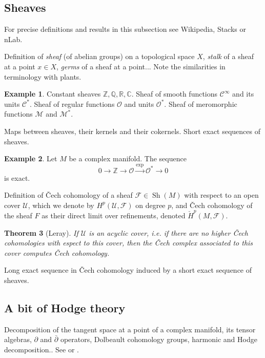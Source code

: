 \documentclass[11pt,A4]{article}
\theoremstyle{plain}
\newtheorem{thm}{Theorem}[section]
\theoremstyle{definition}
\newtheorem{exa}[thm]{Example}
\theoremstyle{remark}
\newcommand{\Z}{\mathbb{Z}}
\newcommand{\Q}{\mathbb{Q}}
\newcommand{\R}{\mathbb{R}}
\newcommand{\1}{\mathbbm{1}}
\newcommand{\C}{\mathbb{C}}
\newcommand{\calC}{\mathcal{C}}
\newcommand{\F}{\mathcal{F}}
\newcommand{\M}{\mathcal{M}}
\renewcommand{\O}{\mathcal{O}}
\newcommand{\U}{\mathcal{U}}
\DeclareMathOperator{\Sh}{Sh}
\begin{document}
\subsection{Sheaves}

For precise definitions and results in this subsection see Wikipedia, Stacks or nLab.

Definition of \textit{sheaf} (of abelian groups) on a topological space $X$, \textit{stalk} of a sheaf at a point $x\in X$, \textit{germs} of a sheaf at a point... Note the similarities in terminology with plants.

\begin{exa}
    Constant sheaves $\Z,\Q,\R,\C$.
    Sheaf of smooth functions $\calC^{\infty}$ and its units $\calC^{*}$.
    Sheaf of regular functions $\O$ and units $\O^{*}$.
    Sheaf of meromorphic functions $\M$ and $\M^{*}$.
\end{exa}

Maps between sheaves, their kernels and their cokernels.
Short exact sequences of sheaves.

\begin{exa}
    Let $M$ be a complex manifold.
    The sequence
    \[ 0\to \Z\to \O\xrightarrow{\exp} \O^{*}\to 0 \]
    is exact.
\end{exa}

Definition of \v{C}ech cohomology of a sheaf $\F\in \Sh(M)$ with respect to an open cover $\U$, which we denote by $H^{p}(\U,\F)$ on degree $p$, and \v{C}ech cohomology of the sheaf $F$ as their direct limit over refinements, denoted $\check{H}^{p}(M,\F)$.

\begin{thm}[Leray]
    If $\U$ is an acyclic cover, i.e. if there are no higher \v{C}ech cohomologies with espect to this cover, then the \v{C}ech complex associated to this cover computes \v{C}ech cohomology.
\end{thm}

Long exact sequence in \v{C}ech cohomology induced by a short exact sequence of sheaves.

\subsection{A bit of Hodge theory}

Decomposition of the tangent space at a point of a complex manifold, its tensor algebras, $\partial $ and $\bar{\partial }$ operators, Dolbeault cohomology groups, harmonic and Hodge decomposition..
See \cite{gh78} or \cite{voi07}.
\end{document}
